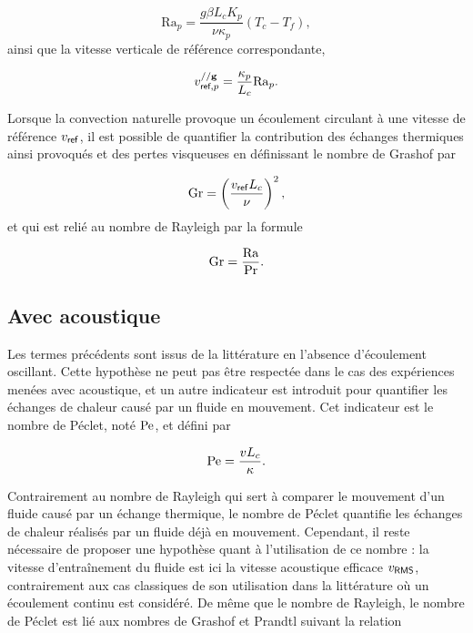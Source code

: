 \begin{equation}
	\mathrm{Ra}_p = \frac{g \beta L_c K_p}{\nu \kappa_p} (T_c-T_f),
	\label{eq:NbrRayleigh_poreux}
\end{equation}
ainsi que la vitesse verticale de référence correspondante, 

\begin{equation}
	v_{\textsf{ref},p}^{// \mathbf g} = \frac{\kappa_p}{L_c} \mathrm{Ra}_p.
	\label{eq:VitesseReference_Rayleigh_poreux}
\end{equation}


Lorsque la convection naturelle provoque un écoulement circulant à une vitesse de référence $v_{\sf ref}$, il est possible de quantifier la contribution des échanges thermiques ainsi provoqués et des pertes visqueuses en définissant le nombre de Grashof par

\begin{equation}
	\mathrm{Gr} = \left( \frac{v_{\sf ref} L_c}{\nu} \right)^2,
	\label{eq:NbrGrashof}
\end{equation}
et qui est relié au nombre de Rayleigh par la formule

\begin{equation}
	\mathrm{Gr} = \frac{\mathrm{Ra}}{\mathrm{Pr}}.
	\label{eq:NbrGrashof_RayleighSurPrandtl}
\end{equation}


\subsection{Avec acoustique}
Les termes précédents sont issus de la littérature en l'absence d'écoulement oscillant. Cette hypothèse ne peut pas être respectée dans le cas des expériences menées avec acoustique, et un autre indicateur est introduit pour quantifier les échanges de chaleur causé par un fluide en mouvement. Cet indicateur est le nombre de Péclet, noté $\mathrm{Pe}$, et défini par

\begin{equation}
	\mathrm{Pe} = \frac{v L_c}{\kappa}.
	\label{eq:NbrPeclet}
\end{equation}

Contrairement au nombre de Rayleigh qui sert à comparer le mouvement d'un fluide causé par un échange thermique, le nombre de Péclet quantifie les échanges de chaleur réalisés par un fluide déjà en mouvement. Cependant, il reste nécessaire de proposer une hypothèse quant à l'utilisation de ce nombre : la vitesse d'entraînement du fluide est ici la vitesse acoustique efficace $v_{\sf RMS}$, contrairement aux cas classiques de son utilisation dans la littérature où un écoulement continu est considéré. De même que le nombre de Rayleigh, le nombre de Péclet est lié aux nombres de Grashof et Prandtl suivant la relation 


